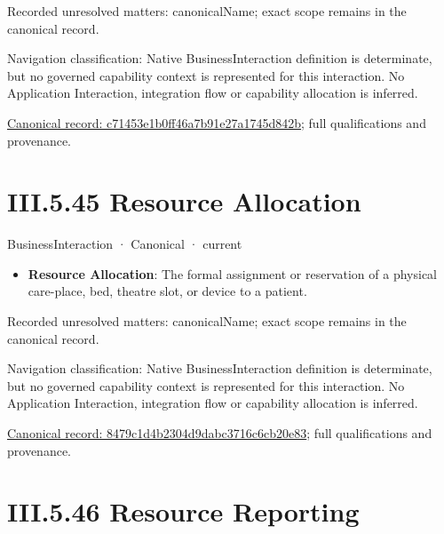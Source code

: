 {\small Recorded unresolved matters: canonicalName; exact scope remains in the canonical record.}\par
{\small Navigation classification: Native BusinessInteraction definition is determinate, but no governed capability context is represented for this interaction. No Application Interaction, integration flow or capability allocation is inferred.}\par
{\footnotesize \href{../../../../continuum/business/business-interaction/c71453e1b0ff46a7b91e27a1745d842b.md}{Canonical record: c71453e1b0ff46a7b91e27a1745d842b}; full qualifications and provenance.}\par
\section*{III.5.45 Resource Allocation}
\label{navigation:III.5.45}

\label{element:8479c1d4b2304d9dabc3716c6cb20e83}
{\small BusinessInteraction · Canonical · current}\par

\begin{itemize}


\item \textbf{Resource Allocation}: The formal assignment or reservation of a physical care-place, bed, theatre slot, or device to a patient.

\end{itemize}

{\small Recorded unresolved matters: canonicalName; exact scope remains in the canonical record.}\par
{\small Navigation classification: Native BusinessInteraction definition is determinate, but no governed capability context is represented for this interaction. No Application Interaction, integration flow or capability allocation is inferred.}\par
{\footnotesize \href{../../../../continuum/business/business-interaction/8479c1d4b2304d9dabc3716c6cb20e83.md}{Canonical record: 8479c1d4b2304d9dabc3716c6cb20e83}; full qualifications and provenance.}\par
\section*{III.5.46 Resource Reporting}
\label{navigation:III.5.46}

